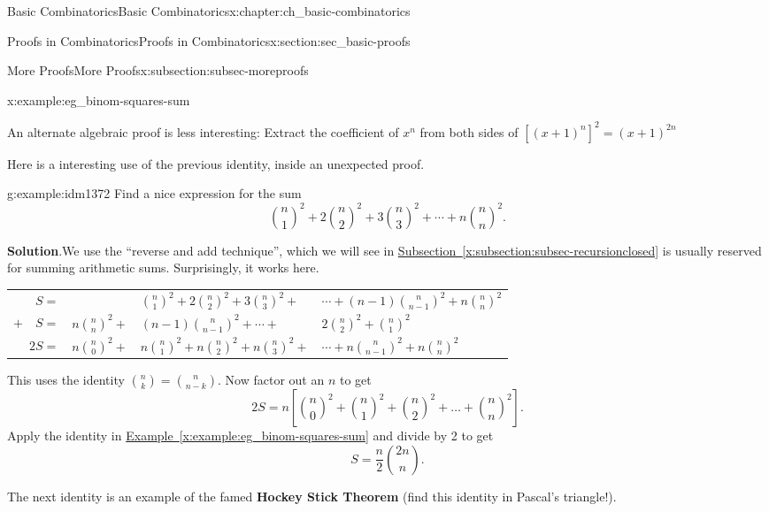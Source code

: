 \documentclass[oneside,10pt,]{book}
\newcommand{\terminology}[1]{\textbf{#1}}
\numberwithin{equation}{chapter}
\newcommand{\hrulethin}  {\noalign{\hrule height 0.04em}}
\begin{document}
\begin{chapterptx}{Basic Combinatorics}{}{Basic Combinatorics}{}{}{x:chapter:ch_basic-combinatorics}
\begin{sectionptx}{Proofs in Combinatorics}{}{Proofs in Combinatorics}{}{}{x:section:sec_basic-proofs}
\begin{subsectionptx}{More Proofs}{}{More Proofs}{}{}{x:subsection:subsec-moreproofs}
\begin{example}{}{x:example:eg_binom-squares-sum}
\par
An alternate algebraic proof is less interesting: Extract the coefficient of \(x^{n}\) from both sides of \(\left\lbrack \left( x + 1 \right)^{n} \right\rbrack^{2} = \left(x + 1 \right)^{2n}\)%
\end{example}
Here is a interesting use of the previous identity, inside an unexpected proof.%
\begin{example}{}{g:example:idm1372}%
Find a nice expression for the sum%
\begin{equation*}
\binom{n}{1}^2 + 2 \binom{n}{2}^2 + 3 \binom{n}{3}^2 + \cdots + n\binom{n}{n}^2\text{.}
\end{equation*}
%
\par\smallskip%
\noindent\textbf{Solution}.\hypertarget{g:solution:idm1376}{}\quad{}We use the ``reverse and add technique'', which we will see in \hyperref[x:subsection:subsec-recursionclosed]{Subsection~\ref{x:subsection:subsec-recursionclosed}} is usually reserved for summing arithmetic sums.  Surprisingly, it works here.%
\begin{sidebyside}{1}{0}{0}{0}%
\begin{sbspanel}{1}%
{\centering%
\begin{tabular}{rlll}
\(S  =\)&&\(\binom{n}{1}^2+2\binom{n}{2}^2+3\binom{n}{3}^2 + \)&\(\cdots +(n-1)\binom{n}{n-1}^2+n\binom{n}{n}^2\)\tabularnewline[0pt]
\(+ \quad S  =\)&\(n\binom{n}{n}^2 + \)&\((n-1)\binom{n}{n-1}^2+ \cdots +\)&\(2\binom{n}{2}^2+\binom{n}{1}^2\)\tabularnewline\hrulethin
\(2S  =\)&\(n\binom{n}{0}^2 + \)&\(n\binom{n}{1}^2 + n\binom{n}{2}^2+ n\binom{n}{3}^2 + \)&\(\cdots + n\binom{n}{n-1}^2+n\binom{n}{n}^2\)
\end{tabular}
\par}
\end{sbspanel}%
\end{sidebyside}%
\par
This uses the identity \(\binom{n}{k} = \binom{n}{n-k}\).  Now factor out an \(n\) to get%
\begin{equation*}
2S = n\left[\binom{n}{0}^{2} + \binom{n}{1}^{2} + \binom{n}{2}^{2} + \ldots + \binom{n}{n}^{2}\right]\text{.}
\end{equation*}
Apply the identity in \hyperref[x:example:eg_binom-squares-sum]{Example~\ref{x:example:eg_binom-squares-sum}} and divide by 2 to get%
\begin{equation*}
S = \frac{n}{2}\binom{2n}{n}\text{.}
\end{equation*}
%
\end{example}
The next identity is an example of the famed \terminology{Hockey Stick Theorem} (find this identity in Pascal's triangle!).%

\end{subsectionptx}
\end{sectionptx}
\end{chapterptx}
\end{document}
